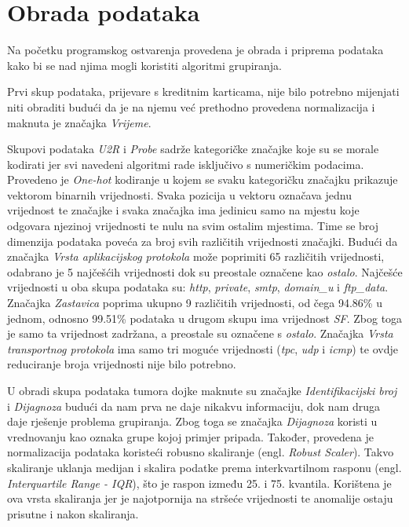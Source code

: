 \documentclass[utf8, diplomski, numeric]{fer}
\begin{document}
\section{Obrada podataka}
Na početku programskog ostvarenja provedena je obrada i priprema podataka kako bi se nad njima mogli koristiti algoritmi grupiranja.

Prvi skup podataka, prijevare s kreditnim karticama, nije bilo potrebno mijenjati niti obraditi budući da je na njemu već prethodno provedena normalizacija i maknuta je značajka \textit{Vrijeme}. 

Skupovi podataka \textit{U2R} i \textit{Probe} sadrže kategoričke značajke koje su se morale kodirati jer svi navedeni algoritmi rade isključivo s numeričkim podacima. Provedeno je \textit{One-hot} kodiranje u kojem se svaku kategoričku značajku prikazuje vektorom binarnih vrijednosti. Svaka pozicija u vektoru označava jednu vrijednost te značajke i svaka značajka ima jedinicu samo na mjestu koje odgovara njezinoj vrijednosti te nulu na svim ostalim mjestima. Time se broj dimenzija podataka poveća za broj svih različitih vrijednosti značajki. Budući da značajka \textit{Vrsta aplikacijskog protokola} može poprimiti 65 različitih vrijednosti, odabrano je 5 najčešćih vrijednosti dok su preostale označene kao \textit{ostalo}. Najčešće vrijednosti u oba skupa podataka su: \textit{http}, \textit{private},  \textit{smtp}, \textit{domain\_u}  i \textit{ftp\_data}. Značajka \textit{Zastavica} poprima ukupno 9 različitih vrijednosti, od čega 94.86\% u jednom, odnosno 99.51\% podataka u drugom skupu ima vrijednost \textit{SF}. Zbog toga je samo ta vrijednost zadržana, a preostale su označene s \textit{ostalo}. Značajka \textit{Vrsta transportnog protokola} ima samo tri moguće vrijednosti (\textit{tpc}, \textit{udp} i \textit{icmp}) te ovdje reduciranje broja vrijednosti nije bilo potrebno.

U obradi skupa podataka tumora dojke maknute su značajke  \textit{Identifikacijski broj} i \textit{Dijagnoza} budući da nam prva ne daje nikakvu informaciju, dok nam druga daje rješenje problema grupiranja. Zbog toga se značajka \textit{Dijagnoza} koristi u vrednovanju kao oznaka grupe kojoj primjer pripada. Također, provedena je normalizacija podataka koristeći robusno skaliranje (engl. \textit{Robust Scaler}). Takvo skaliranje uklanja medijan i skalira podatke prema interkvartilnom rasponu (engl. \textit{Interquartile Range - IQR}), što je raspon između 25. i 75. kvantila. Korištena je ova vrsta skaliranja jer je najotpornija na stršeće vrijednosti te anomalije ostaju prisutne i nakon skaliranja.
\end{document}
